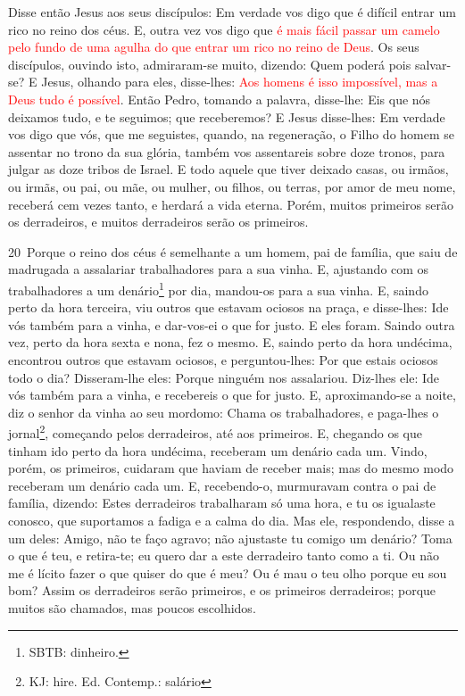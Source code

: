 Disse então Jesus aos seus discípulos: Em verdade vos digo que é
difícil entrar um rico no reino dos céus. E, outra vez vos
digo que \textcolor{red}{é mais fácil passar um camelo pelo fundo de uma
agulha do que entrar um rico no reino de Deus}. Os seus
discípulos, ouvindo isto, admiraram-se muito, dizendo: Quem poderá
pois salvar-se? E Jesus, olhando para eles, disse-lhes:
\textcolor{red}{Aos homens é isso impossível, mas a Deus tudo é possível}.
Então Pedro, tomando a palavra, disse-lhe: Eis que nós
deixamos tudo, e te seguimos; que receberemos? E Jesus
disse-lhes: Em verdade vos digo que vós, que me seguistes, quando,
na regeneração, o Filho do homem se assentar no trono da sua glória,
também vos assentareis sobre doze tronos, para julgar as doze tribos
de Israel. E todo aquele que tiver deixado casas, ou irmãos,
ou irmãs, ou pai, ou mãe, ou mulher, ou filhos, ou terras, por amor
de meu nome, receberá cem vezes tanto, e herdará a vida eterna.
Porém, muitos primeiros serão os derradeiros, e muitos
derradeiros serão os primeiros.

\medskip

\lettrine{20}\ Porque o reino dos céus é semelhante a um homem,
pai de família, que saiu de madrugada a assalariar trabalhadores
para a sua vinha. E, ajustando com os trabalhadores a um
denário\footnote{SBTB: dinheiro.} por dia, mandou-os para a sua
vinha. E, saindo perto da hora terceira, viu outros que estavam
ociosos na praça, e disse-lhes: Ide vós também para a vinha, e
dar-vos-ei o que for justo. E eles foram. Saindo outra vez,
perto da hora sexta e nona, fez o mesmo. E, saindo perto da hora
undécima, encontrou outros que estavam ociosos, e perguntou-lhes:
Por que estais ociosos todo o dia? Disseram-lhe eles: Porque
ninguém nos assalariou. Diz-lhes ele: Ide vós também para a vinha, e
recebereis o que for justo. E, aproximando-se a noite, diz o
senhor da vinha ao seu mordomo: Chama os trabalhadores, e paga-lhes
o jornal\footnote{KJ: hire. Ed. Contemp.: salário}, começando pelos
derradeiros, até aos primeiros. E, chegando os que tinham ido
perto da hora undécima, receberam um denário cada um. Vindo,
porém, os primeiros, cuidaram que haviam de receber mais; mas do
mesmo modo receberam um denário cada um. E, recebendo-o,
murmuravam contra o pai de família, dizendo: Estes
derradeiros trabalharam só uma hora, e tu os igualaste conosco, que
suportamos a fadiga e a calma do dia. Mas ele, respondendo,
disse a um deles: Amigo, não te faço agravo; não ajustaste tu comigo
um denário? Toma o que é teu, e retira-te; eu quero dar a
este derradeiro tanto como a ti. Ou não me é lícito fazer o
que quiser do que é meu? Ou é mau o teu olho porque eu sou bom?
Assim os derradeiros serão primeiros, e os primeiros
derradeiros; porque muitos são chamados, mas poucos escolhidos.

